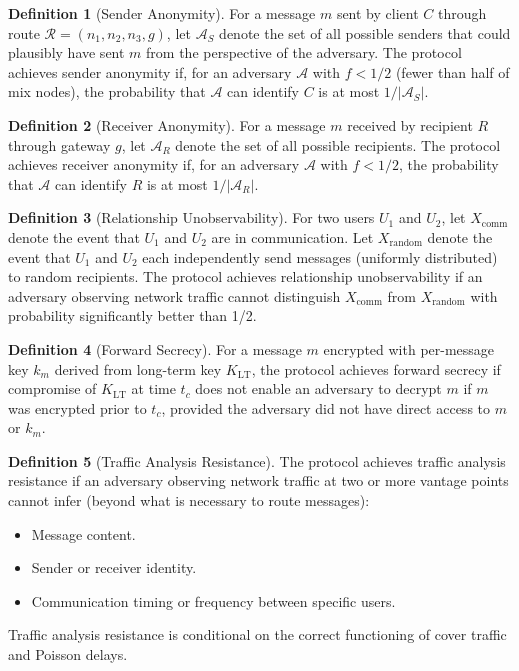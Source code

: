 \documentclass[11pt]{article}
\theoremstyle{definition}
\newtheorem{definition}{Definition}
\theoremstyle{remark}
\begin{document}
\begin{definition}[Sender Anonymity]
\label{def:sender-anon}
For a message $m$ sent by client $C$ through route $\mathcal{R} = (n_1, n_2, n_3, g)$, let $\mathcal{A}_S$ denote the set of all possible senders that could plausibly have sent $m$ from the perspective of the adversary. The protocol achieves sender anonymity if, for an adversary $\mathcal{A}$ with $f < 1/2$ (fewer than half of mix nodes), the probability that $\mathcal{A}$ can identify $C$ is at most $1/|\mathcal{A}_S|$.
\end{definition}

\begin{definition}[Receiver Anonymity]
\label{def:receiver-anon}
For a message $m$ received by recipient $R$ through gateway $g$, let $\mathcal{A}_R$ denote the set of all possible recipients. The protocol achieves receiver anonymity if, for an adversary $\mathcal{A}$ with $f < 1/2$, the probability that $\mathcal{A}$ can identify $R$ is at most $1/|\mathcal{A}_R|$.
\end{definition}

\begin{definition}[Relationship Unobservability]
\label{def:rel-unobs}
For two users $U_1$ and $U_2$, let $X_{\text{comm}}$ denote the event that $U_1$ and $U_2$ are in communication. Let $X_{\text{random}}$ denote the event that $U_1$ and $U_2$ each independently send messages (uniformly distributed) to random recipients. The protocol achieves relationship unobservability if an adversary observing network traffic cannot distinguish $X_{\text{comm}}$ from $X_{\text{random}}$ with probability significantly better than 1/2.
\end{definition}

\begin{definition}[Forward Secrecy]
\label{def:fwd-sec}
For a message $m$ encrypted with per-message key $k_m$ derived from long-term key $K_{\text{LT}}$, the protocol achieves forward secrecy if compromise of $K_{\text{LT}}$ at time $t_c$ does not enable an adversary to decrypt $m$ if $m$ was encrypted prior to $t_c$, provided the adversary did not have direct access to $m$ or $k_m$.
\end{definition}

\begin{definition}[Traffic Analysis Resistance]
\label{def:tar}
The protocol achieves traffic analysis resistance if an adversary observing network traffic at two or more vantage points cannot infer (beyond what is necessary to route messages):
\begin{itemize}
    \item Message content.
    \item Sender or receiver identity.
    \item Communication timing or frequency between specific users.
\end{itemize}
Traffic analysis resistance is conditional on the correct functioning of cover traffic and Poisson delays.
\end{definition}
\end{document}
